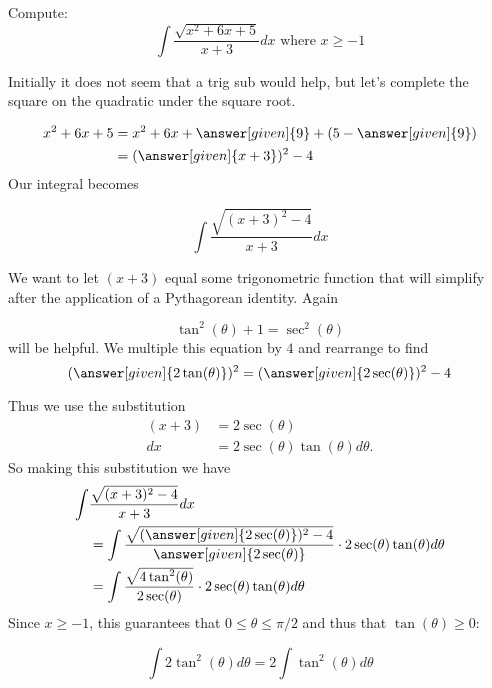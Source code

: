 \documentclass{ximera}
\begin{document}
\begin{example}
  Compute:
  \[
  \int \frac{\sqrt{x^2+6x+5}}{x+3}dx \text{ where } x \geq -1
  \]

  \begin{explanation}
  Initially it does not seem that a trig sub would help, but let's complete the square on the quadratic under the square root.

    \begin{align*}
      x^2+6x+5 &= x^2+6x+\answer[given]{9}+(5-\answer[given]{9})\\
      &= (\answer[given]{x+3})^2-4
    \end{align*}
    Our integral becomes

    \[
    \int \frac{\sqrt{(x+3)^2-4}}{x+3}dx
    \]

    We want to let $(x+3)$ equal some trigonometric
    function that will simplify after the application of a
    Pythagorean identity. Again 

    \[
    \tan^2(\theta) + 1 = \sec^2(\theta)
    \]
    will be helpful. We multiple this equation by $4$ and rearrange to find
    \[
    (\answer[given]{2\tan(\theta)})^2 = (\answer[given]{2\sec(\theta)})^2 - 4
    \]

    Thus we use the substitution 
    \begin{align*}
      (x+3) &=  2\sec(\theta)\\
      dx &= 2\sec(\theta)\tan(\theta) d\theta.
    \end{align*}
    So making this substitution we have
    \begin{align*}
      \int &\frac{\sqrt{(x+3)^2-4}}{x+3}dx \\
      &= \int\frac{\sqrt{(\answer[given]{2\sec(\theta)})^2-4}}{\answer[given]{2\sec(\theta)}} \cdot 2\sec(\theta)\tan(\theta)d\theta\\
      &= \int\frac{\sqrt{4\tan^{2}(\theta)}}{2\sec(\theta)} \cdot 2\sec(\theta)\tan(\theta)d\theta\\
    \end{align*}
    Since $x\geq -1$, this guarantees that $0\leq \theta \leq \pi/2$ and thus that 
$\tan(\theta) \geq 0$:

    \[
    \int 2 \tan^2(\theta) d\theta = 2\int \tan^2(\theta) d\theta
    \]


\end{explanation}
\end{example}
\end{document}
